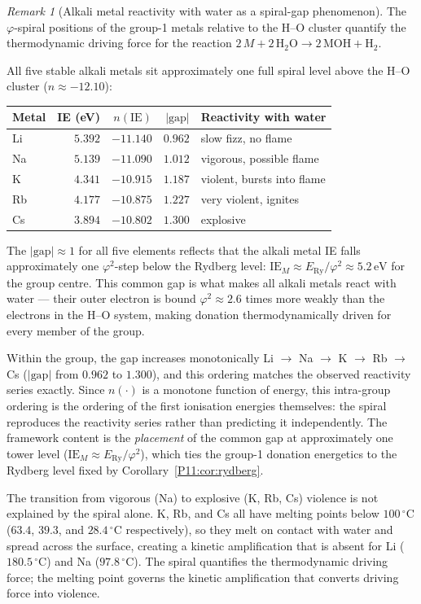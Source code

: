 \documentclass[11pt,a4paper]{article}
\theoremstyle{definition}
\theoremstyle{remark}
\newtheorem{remark}[theorem]{Remark}
\newcommand{\vp}{\varphi}
\newcommand{\ERy}{E_{\mathrm{Ry}}}
\newcommand{\nlvl}[1]{n\!\left(#1\right)}
\newcommand{\IE}{\mathrm{IE}}
\begin{document}
\begin{remark}[Alkali metal reactivity with water as a spiral-gap phenomenon]
\label{P11:rem:alkali_reactivity}
The $\vp$-spiral positions of the group-1 metals relative to the H--O
cluster quantify the thermodynamic driving force for the reaction
$2\,M + 2\,\mathrm{H_2O} \to 2\,\mathrm{MOH} + \mathrm{H_2}$.

All five stable alkali metals sit approximately one full spiral level
above the H--O cluster ($n \approx -12.10$):
\begin{center}
\begin{tabular}{lrrrl}
\toprule
Metal & IE (eV) & $n(\IE)$ & $|\text{gap}|$ & Reactivity with water \\
\midrule
Li & $5.392$ & $-11.140$ & $0.962$ & slow fizz, no flame \\
Na & $5.139$ & $-11.090$ & $1.012$ & vigorous, possible flame \\
K  & $4.341$ & $-10.915$ & $1.187$ & violent, bursts into flame \\
Rb & $4.177$ & $-10.875$ & $1.227$ & very violent, ignites \\
Cs & $3.894$ & $-10.802$ & $1.300$ & explosive \\
\bottomrule
\end{tabular}
\end{center}
The $|\text{gap}| \approx 1$ for all five elements reflects that the
alkali metal IE falls approximately one $\vp^2$-step below the
Rydberg level: $\IE_M \approx \ERy/\vp^2 \approx 5.2\,\mathrm{eV}$
for the group centre.
This common gap is what makes all alkali metals react with water ---
their outer electron is bound $\vp^2 \approx 2.6$ times more weakly
than the electrons in the H--O system, making donation thermodynamically
driven for every member of the group.

Within the group, the gap increases monotonically
Li $\to$ Na $\to$ K $\to$ Rb $\to$ Cs ($|\text{gap}|$ from
$0.962$ to $1.300$), and this ordering matches the observed reactivity
series exactly.
Since $\nlvl{\cdot}$ is a monotone function of energy, this
intra-group ordering is the ordering of the first ionisation
energies themselves: the spiral reproduces the reactivity series
rather than predicting it independently.  The framework content is
the \emph{placement} of the common gap at approximately one tower
level ($\IE_M\approx\ERy/\vp^2$), which ties the group-1 donation
energetics to the Rydberg level fixed by
Corollary~\ref{P11:cor:rydberg}.

The transition from vigorous (Na) to explosive (K, Rb, Cs) violence
is not explained by the spiral alone.
K, Rb, and Cs all have melting points below $100\,^{\circ}\mathrm{C}$
($63.4$, $39.3$, and $28.4\,^{\circ}\mathrm{C}$ respectively),
so they melt on contact with water and spread across the surface,
creating a kinetic amplification that is absent for Li
($180.5\,^{\circ}\mathrm{C}$) and Na ($97.8\,^{\circ}\mathrm{C}$).
The spiral quantifies the thermodynamic driving force; the melting
point governs the kinetic amplification that converts driving force
into violence.
\end{remark}
\end{document}
